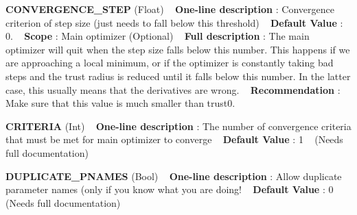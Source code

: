 \begin{DoxyItemize}
\item {\bfseries  C\+O\+N\+V\+E\+R\+G\+E\+N\+C\+E\+\_\+\+S\+T\+EP } (Float) ~\newline
{\bfseries  One-\/line description }\+: Convergence criterion of step size (just needs to fall below this threshold) ~\newline
{\bfseries  Default Value }\+: 0. ~\newline
{\bfseries  Scope }\+: Main optimizer (Optional) ~\newline
{\bfseries  Full description }\+: The main optimizer will quit when the step size falls below this number. This happens if we are approaching a local minimum, or if the optimizer is constantly taking bad steps and the trust radius is reduced until it falls below this number. In the latter case, this usually means that the derivatives are wrong. ~\newline
{\bfseries  Recommendation }\+: Make sure that this value is much smaller than trust0.\end{DoxyItemize}
\begin{DoxyItemize}
\item {\bfseries  C\+R\+I\+T\+E\+R\+IA } (Int) ~\newline
{\bfseries  One-\/line description }\+: The number of convergence criteria that must be met for main optimizer to converge ~\newline
{\bfseries  Default Value }\+: 1 ~\newline
(Needs full documentation)\end{DoxyItemize}
\begin{DoxyItemize}
\item {\bfseries  D\+U\+P\+L\+I\+C\+A\+T\+E\+\_\+\+P\+N\+A\+M\+ES } (Bool) ~\newline
{\bfseries  One-\/line description }\+: Allow duplicate parameter names (only if you know what you are doing! ~\newline
{\bfseries  Default Value }\+: 0 ~\newline
(Needs full documentation)\end{DoxyItemize}
